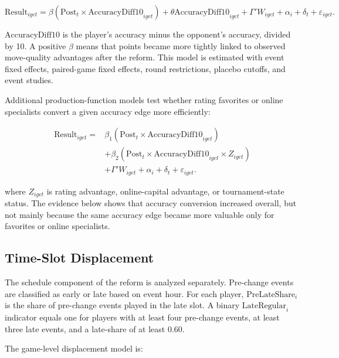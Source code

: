 \begin{equation}
\label{eq:accuracy}
\text{Result}_{iget}
= \beta \left(\text{Post}_{t} \times \text{AccuracyDiff10}_{iget}\right)
+ \theta \text{AccuracyDiff10}_{iget}
+ \Gamma' W_{iget}
+ \alpha_i
+ \delta_t
+ \varepsilon_{iget}.
\end{equation}

\noindent \(\text{AccuracyDiff10}\) is the player's accuracy minus the opponent's accuracy, divided by 10. A positive \(\beta\) means that points became more tightly linked to observed move-quality advantages after the reform. This model is estimated with event fixed effects, paired-game fixed effects, round restrictions, placebo cutoffs, and event studies.

Additional production-function models test whether rating favorites or online specialists convert a given accuracy edge more efficiently:

\begin{equation}
\label{eq:tripleaccuracy}
\begin{aligned}
\text{Result}_{iget}
= {} & \beta_1(\text{Post}_t \times \text{AccuracyDiff10}_{iget}) \\
& + \beta_2(\text{Post}_t \times \text{AccuracyDiff10}_{iget} \times Z_{iget}) \\
& + \Gamma' W_{iget} + \alpha_i + \delta_t + \varepsilon_{iget}.
\end{aligned}
\end{equation}

\noindent where \(Z_{iget}\) is rating advantage, online-capital advantage, or tournament-state status. The evidence below shows that accuracy conversion increased overall, but not mainly because the same accuracy edge became more valuable only for favorites or online specialists.

\subsection{Time-Slot Displacement}

The schedule component of the reform is analyzed separately. Pre-change events are classified as early or late based on event hour. For each player, \(\text{PreLateShare}_i\) is the share of pre-change events played in the late slot. A binary \(\text{LateRegular}_i\) indicator equals one for players with at least four pre-change events, at least three late events, and a late-share of at least 0.60.

The game-level displacement model is:

